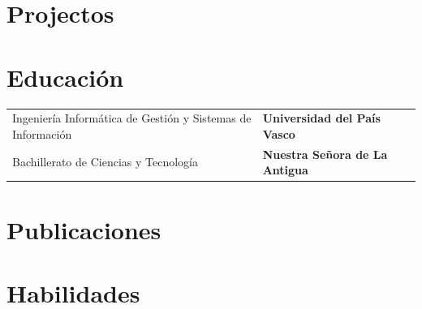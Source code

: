 \documentclass[a4paper,12pt]{article}
\begin{document}
\section{Projectos}


\section{Educación}
\begin{tabularx}{\linewidth}{@{}l X@{}}	
Ingeniería Informática de Gestión y Sistemas de Información & \hfill\textbf{Universidad del País Vasco} \\[3.75pt]

Bachillerato de Ciencias y Tecnología & \hfill\textbf{Nuestra Señora de La Antigua} \\[3.75pt]
\end{tabularx}

\section{Publicaciones}
\begin{refsection}
\nocite{*}
\printbibliography[heading=none]
\end{refsection}

\section{Habilidades}

\vfill
{}
\end{document}
